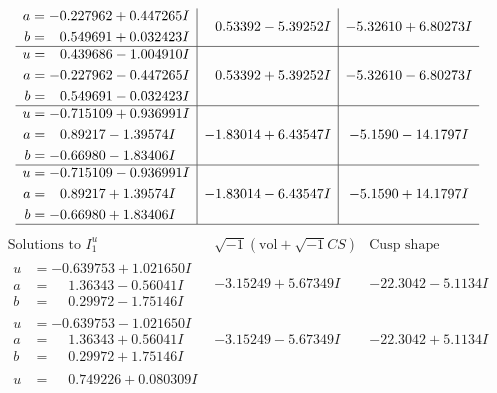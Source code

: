 \documentclass[1p]{elsarticle_modified}
\theoremstyle{definition}
\newcommand{\I}{\sqrt{-1}}
\begin{document}
$$\begin{array}{c|c|c}
\begin{aligned}
a &= -0.227962 + 0.447265 I \\
b &= \phantom{-}0.549691 + 0.032423 I\end{aligned}
 & \phantom{-}0.53392 - 5.39252 I & -5.32610 + 6.80273 I \\ \hline\begin{aligned}
u &= \phantom{-}0.439686 - 1.004910 I \\
a &= -0.227962 - 0.447265 I \\
b &= \phantom{-}0.549691 - 0.032423 I\end{aligned}
 & \phantom{-}0.53392 + 5.39252 I & -5.32610 - 6.80273 I \\ \hline\begin{aligned}
u &= -0.715109 + 0.936991 I \\
a &= \phantom{-}0.89217 - 1.39574 I \\
b &= -0.66980 - 1.83406 I\end{aligned}
 & -1.83014 + 6.43547 I & -5.1590 - 14.1797 I \\ \hline\begin{aligned}
u &= -0.715109 - 0.936991 I \\
a &= \phantom{-}0.89217 + 1.39574 I \\
b &= -0.66980 + 1.83406 I\end{aligned}
 & -1.83014 - 6.43547 I & -5.1590 + 14.1797 I\\
 \hline 
 \end{array}$$\newpage$$\begin{array}{c|c|c}  
\text{Solutions to }I^u_{1}& \I (\text{vol} + \sqrt{-1}CS) & \text{Cusp shape}\\
 \hline 
\begin{aligned}
u &= -0.639753 + 1.021650 I \\
a &= \phantom{-}1.36343 - 0.56041 I \\
b &= \phantom{-}0.29972 - 1.75146 I\end{aligned}
 & -3.15249 + 5.67349 I & -22.3042 - 5.1134 I \\ \hline\begin{aligned}
u &= -0.639753 - 1.021650 I \\
a &= \phantom{-}1.36343 + 0.56041 I \\
b &= \phantom{-}0.29972 + 1.75146 I\end{aligned}
 & -3.15249 - 5.67349 I & -22.3042 + 5.1134 I \\ \hline\begin{aligned}
u &= \phantom{-}0.749226 + 0.080309 I \\

\end{aligned}
\end{array}$$
\end{document}
